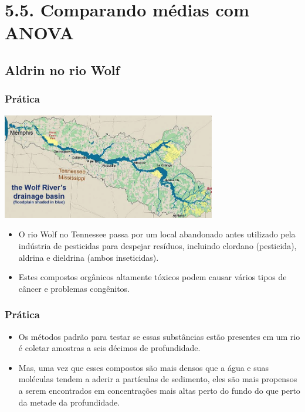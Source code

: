 
\section{5.5. Comparando médias com ANOVA}


\subsection{Aldrin no rio Wolf}


\begin{frame}
\frametitle{Prática}

\begin{center}
\includegraphics[width=0.7\textwidth]{5-5_anova/wolf.png}
\end{center}

{\small
\begin{itemize}
\justifying
\item O rio Wolf no Tennessee passa por um local abandonado antes utilizado pela indústria de pesticidas para despejar resíduos, incluindo clordano (pesticida), aldrina e dieldrina (ambos inseticidas).

\pause
\justifying
\item Estes compostos orgânicos altamente tóxicos podem causar vários tipos de câncer e problemas congênitos.

\end{itemize}
}
\end{frame}

\begin{frame}
\frametitle{Prática}

{\small
\begin{itemize}
\justifying
\item Os métodos padrão para testar se essas substâncias estão presentes em um rio é coletar amostras a seis décimos de profundidade. 

\pause
\justifying
\item Mas, uma vez que esses compostos são mais densos que a água e suas moléculas tendem a aderir a partículas de sedimento, eles são mais propensos a serem encontrados em concentrações mais altas perto do fundo do que perto da metade da profundidade.

\end{itemize}
}

\end{frame}

